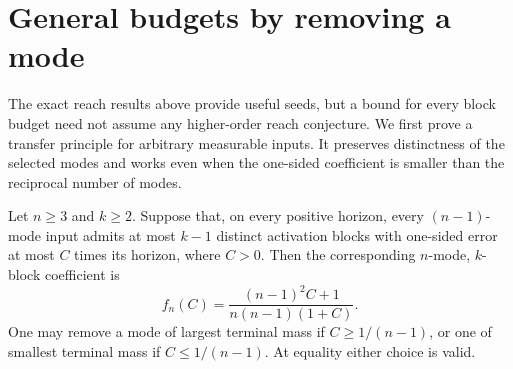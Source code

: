 \section{General budgets by removing a mode}\label{sec:general-budgets}

The exact reach results above provide useful seeds, but a bound for every
block budget need not assume any higher-order reach conjecture. We first
prove a transfer principle for arbitrary measurable inputs. It preserves
distinctness of the selected modes and works even when the one-sided
coefficient is smaller than the reciprocal number of modes.

\begin{lemma}\label{lem:mode-removal}
Let $n\ge3$ and $k\ge2$. Suppose that, on every positive horizon, every
$(n-1)$-mode input admits at most $k-1$ distinct activation blocks with
one-sided error at most $C$ times its horizon, where $C>0$. Then the
corresponding $n$-mode, $k$-block coefficient is
\begin{equation}\label{eq:mode-removal}
 f_n(C)=\frac{(n-1)^2C+1}{n(n-1)(1+C)}.
\end{equation}
One may remove a mode of largest terminal mass if $C\ge1/(n-1)$, or
one of smallest terminal mass if $C\le1/(n-1)$. At equality either choice
is valid.
\end{lemma}
